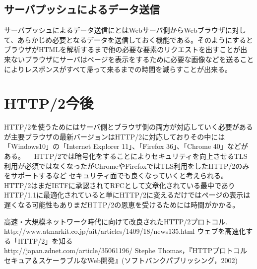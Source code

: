 \documentclass[a4j,9pt,twocolumn]{jsarticle}
\begin{document}
\subsection{サーバプッシュによるデータ送信}
サーバプッシュによるデータ送信にとはWebサーバ側からWebブラウザに対して、あらかじめ必要となるデータを送信しておく機能である。そのようにするとブラウザがHTMLを解析するまで他の必要な要素のリクエストを出すことが出来ないブラウザにサーバはページを表示をするために必要な画像などを送ることによりレスポンスがすべて帰って来るまでの時間を減らすことが出来る。

\section{HTTP/2今後}
HTTP/2を使うためにはサーバ側とブラウザ側の両方が対応していく必要があるが主要ブラウザの最新バージョンはHTTP/2に対応しておりその中には「Windows10」の「Internet Explorer 11」、「Firefox 36」、「Chrome 40」などがある。
　HTTP/2では暗号化をすることによりセキュリティを向上させるTLS利用が必須ではなくなったがChromeやFirefoxではTLS利用をしたHTTP/2のみをサポートするなど
セキュリティ面でも良くなっていくと考えられる。HTTP/2はまだIETFに承認されてRFCとして文章化されている最中でありHTTP/1.1に最適化されていると単にHTTP/2に変えるだけではページの表示は遅くなる可能性もありまだHTTP/2の恩恵を受けるためには時間がかかる。







\begin{thebibliography}{3}
  高速・大規模ネットワーク時代に向けて改良されたHTTP/2プロトコル.\\http://www.atmarkit.co.jp/ait/articles/1409/18/news135.html
 ウェブを高速化する「HTTP/2」を知る\\http://japan.zdnet.com/article/35061196/
 Stephe Thomas，『HTTPプロトコル　セキュア＆スケーラブルなWeb開発』(ソフトバンクパブリッシング，2002)

\end{thebibliography}
\end{document}
